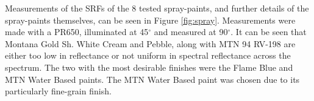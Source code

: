 Measurements of the \glspl{SRF} of the 8 tested spray-paints, and further details of the spray-paints themselves, can be seen in Figure \ref{fig:spray}. Measurements were made with a \gls{PR650}, illuminated at 45$^{\circ}$ and measured at 90$^{\circ}$. It can be seen that Montana Gold Sh. White Cream and Pebble, along with MTN 94 RV-198 are either too low in reflectance or not uniform in spectral reflectance across the spectrum. The two with the most desirable finishes were the Flame Blue and MTN Water Based paints. The MTN Water Based paint was chosen due to its particularly fine-grain finish.



